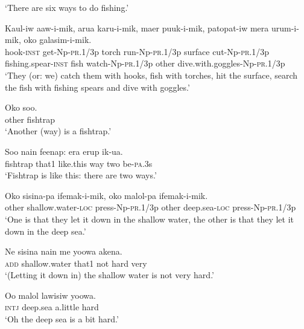 \glt ‘There are six ways to do fishing.’ \\
\z


\ea
\gll  Kaul-iw  aaw-i-mik,  arua  karu-i-mik,     maer  puuk-i-mik,  patopat-iw  mera                urum-i-mik,  oko  galasim-i-mik. \\
hook-\textsc{inst}  get-Np-\textsc{pr}.1/3p  torch  run-Np-\textsc{pr}.1/3p surface  cut-Np-\textsc{pr}.1/3p  fishing.spear-\textsc{inst}  fish  watch-Np-\textsc{pr}.1/3p  other  dive.with.goggles-Np-\textsc{pr}.1/3p \\




\glt ‘They (or: we) catch them with hooks, fish with torches, hit the surface, search the fish with fishing spears and dive with goggles.’ \\
\z


\ea
\gll  Oko  soo. \\
other  fishtrap \\
\glt ‘Another (way) is a fishtrap.’ \\
\z


\ea
\gll  Soo  nain  feenap:  era  erup  ik-ua. \\
fishtrap  that1  like.this  way  two  be-\textsc{pa}.3s \\
\glt ‘Fishtrap is like this: there are two ways.’ \\
\z


\ea
\gll  Oko  sisina-pa  ifemak-i-mik,  oko  malol-pa               ifemak-i-mik. \\
other  shallow.water-\textsc{loc}  press-Np-\textsc{pr}.1/3p  other  deep.sea-\textsc{loc}  press-Np-\textsc{pr}.1/3p \\


\glt ‘One is that they let it down in the shallow water, the other is that they let it down in the deep sea.’ \\
\z


\ea
\gll  Ne  sisina  nain  me  yoowa  akena. \\
\textsc{add}  shallow.water  that1  not  hard  very \\
\glt ‘(Letting it down in) the shallow water is not very hard.’ \\
\z


\ea
\gll  Oo  malol  lawisiw  yoowa. \\
\textsc{intj}  deep.sea  a.little  hard \\
\glt ‘Oh the deep sea is a bit hard.’ \\
\z


